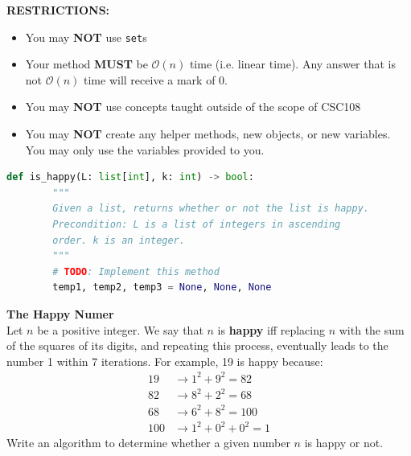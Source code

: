 \documentclass[letterpaper,12pt,addpoints]{exam}
\begin{document}
\begin{questions}
    \begin{center}

        \textbf{RESTRICTIONS:}
        \begin{itemize}
            \item You may \textbf{NOT} use \texttt{set}s
            \item Your method \textbf{MUST} be $\mathcal{O}(n)$ time (i.e. linear time). Any
                  answer that is not $\mathcal{O}(n)$ time will receive a mark of 0.
            \item You may \textbf{NOT} use concepts taught outside of the scope of CSC108
            \item You may \textbf{NOT} create any helper methods, new objects, or new variables.
                  You may only use the variables provided to you.
        \end{itemize}
    \end{center}

    \begin{lstlisting}[language=Python, style=mystyle]
    def is_happy(L: list[int], k: int) -> bool:
        """
        Given a list, returns whether or not the list is happy.
        Precondition: L is a list of integers in ascending 
        order. k is an integer.
        """
        # TODO: Implement this method
        temp1, temp2, temp3 = None, None, None
    \end{lstlisting}

    \clearpage
    \question[10] \textbf{The Happy Numer} \\
    Let $n$ be a positive integer. We say that $n$ is \textbf{happy} iff replacing $n$ with the sum of the squares of its digits, and repeating this process, eventually leads to the number 1 within 7 iterations. For example, 19 is happy because:
    \begin{align*}
        19  & \rightarrow 1^2 + 9^2 = 82      \\
        82  & \rightarrow 8^2 + 2^2 = 68      \\
        68  & \rightarrow 6^2 + 8^2 = 100     \\
        100 & \rightarrow 1^2 + 0^2 + 0^2 = 1
    \end{align*}
    Write an algorithm to determine whether a given number $n$ is happy or not.


\end{questions}
\end{document}
